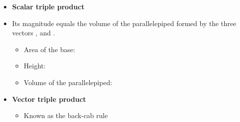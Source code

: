 \ELhold


\begin{ELunit}

\begin{itemize}
\tightlist
\item
  \textbf{Scalar triple product}
\end{itemize}


\begin{itemize}
\tightlist
\item
  Its magnitude equals the volume of the parallelepiped formed by the three vectors ,  and .

  \begin{itemize}
  \tightlist
  \item
    Area of the base: 
  \item
    Height: 
  \item
    Volume of the parallelepiped: 
  \end{itemize}
\end{itemize}


\begin{itemize}
\tightlist
\item
  \textbf{Vector triple product}

  \begin{itemize}
  \tightlist
  \item
    Known as the back-cab rule
  \end{itemize}
\end{itemize}


\end{ELunit}


